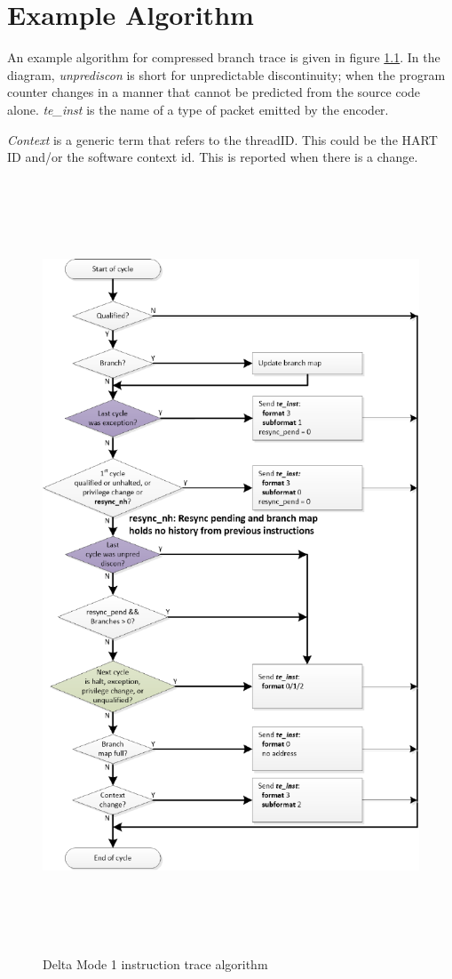 \chapter{Example Algorithm}

An example algorithm for compressed branch trace is given in figure \ref{fig:algo}. In the diagram, {\textit {unprediscon}} is short for unpredictable discontinuity; when the program counter changes in a manner that cannot be predicted from the source code alone. {\textit {te\_inst}} is the name of a type of packet emitted by the encoder. 

\textit{Context} is a generic term that refers to the threadID. This could be the HART ID and/or the software context id. This is reported when there is a change.

\begin{figure}[l]
\begin{center}
  \includegraphics[height=23cm, width=15cm]{algo.pdf}
  \caption{Delta Mode 1 instruction trace algorithm}
  \label{fig:algo}
\end{center}
\end{figure}

